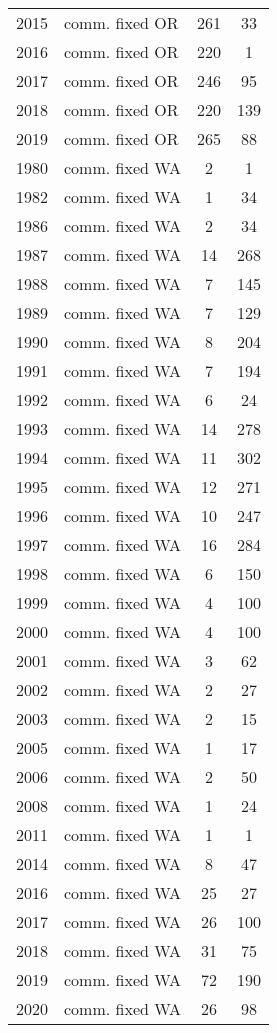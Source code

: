 \begin{longtable}[t]{c>{\centering\arraybackslash}p{4cm}cc}
2015 & comm. fixed OR & 261 & 33\\
2016 & comm. fixed OR & 220 & 1\\
2017 & comm. fixed OR & 246 & 95\\
2018 & comm. fixed OR & 220 & 139\\
2019 & comm. fixed OR & 265 & 88\\
1980 & comm. fixed WA & 2 & 1\\
1982 & comm. fixed WA & 1 & 34\\
1986 & comm. fixed WA & 2 & 34\\
1987 & comm. fixed WA & 14 & 268\\
1988 & comm. fixed WA & 7 & 145\\
1989 & comm. fixed WA & 7 & 129\\
1990 & comm. fixed WA & 8 & 204\\
1991 & comm. fixed WA & 7 & 194\\
1992 & comm. fixed WA & 6 & 24\\
1993 & comm. fixed WA & 14 & 278\\
1994 & comm. fixed WA & 11 & 302\\
1995 & comm. fixed WA & 12 & 271\\
1996 & comm. fixed WA & 10 & 247\\
1997 & comm. fixed WA & 16 & 284\\
1998 & comm. fixed WA & 6 & 150\\
1999 & comm. fixed WA & 4 & 100\\
2000 & comm. fixed WA & 4 & 100\\
2001 & comm. fixed WA & 3 & 62\\
2002 & comm. fixed WA & 2 & 27\\
2003 & comm. fixed WA & 2 & 15\\
2005 & comm. fixed WA & 1 & 17\\
2006 & comm. fixed WA & 2 & 50\\
2008 & comm. fixed WA & 1 & 24\\
2011 & comm. fixed WA & 1 & 1\\
2014 & comm. fixed WA & 8 & 47\\
2016 & comm. fixed WA & 25 & 27\\
2017 & comm. fixed WA & 26 & 100\\
2018 & comm. fixed WA & 31 & 75\\
2019 & comm. fixed WA & 72 & 190\\
2020 & comm. fixed WA & 26 & 98\\*
\end{longtable}
\endgroup{}
\endgroup{}

